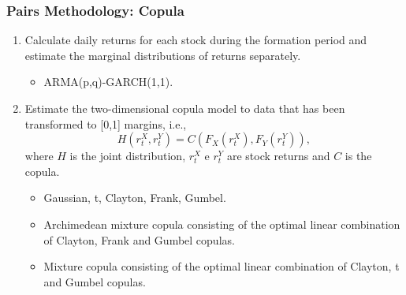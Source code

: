 \documentclass[pdf,9pt,xcolor=dvipsnames,hide notes]{beamer}
\begin{document}
	
\begin{frame}[label=frame4h]
	\frametitle{Pairs Methodology: Copula}
	
	
	\begin{enumerate}[(1)]
		\justifying
		
		\item  Calculate daily returns for each stock during the formation period and estimate the marginal distributions of returns separately.
		\vspace{0.3cm}
		
		\begin{itemize}	
			\item ARMA(p,q)-GARCH(1,1).
		\end{itemize}
		
		\vspace{0.3cm}
		
		\pause
		\item Estimate the two-dimensional copula model to data that has been transformed to [0,1] margins, i.e.,
		\[
		H\left( r_{t}^{X},r_{t}^{Y}\right) =C\left(F_{X}\left( r_{t}^{X}\right)
		,F_{Y}\left( r_{t}^{Y}\right) \right) , 
		\]%
		where $H$ is the joint distribution, $r_{t}^{X}$ e $r_{t}^{Y}$ are stock
		returns and $C$ is the copula.
		
		\vspace{0.3cm}
		
		\pause
		
		\begin{itemize}	
			\item Gaussian, t, Clayton, Frank, Gumbel.
			\item Archimedean mixture copula consisting of the optimal linear combination of Clayton, Frank and Gumbel copulas.
			\item Mixture copula consisting of the optimal linear combination of Clayton, t and Gumbel copulas.
			
			
		\end{itemize}
		
		\end{enumerate}
	\end{frame}
\end{document}
